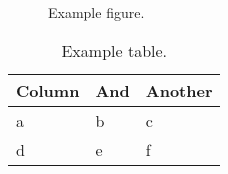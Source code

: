 \begin{figure}
\begin{center}\end{center}
\caption[Example]{Example figure.}
\label{fig:example}
\end{figure}

\begin{table}\tablefont
\begin{tabular}{lll}
\toprule
Column & And & Another \\
\midrule
a & b & c \\
d & e & f \\
\bottomrule
\end{tabular}
\caption[Example]{Example table.}
\label{tab:example}
\end{table}
\fi
